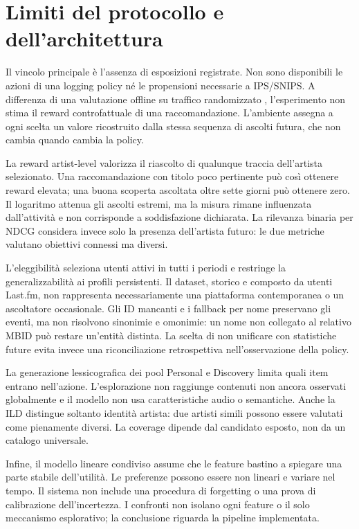 \section{Limiti del protocollo e dell'architettura}
Il vincolo principale è l'assenza di esposizioni registrate. Non sono disponibili le azioni di una logging policy né le propensioni necessarie a IPS/SNIPS. A differenza di una valutazione offline su traffico randomizzato \cite{li2010offline}, l'esperimento non stima il reward controfattuale di una raccomandazione. L'ambiente assegna a ogni scelta un valore ricostruito dalla stessa sequenza di ascolti futura, che non cambia quando cambia la policy.

La reward artist-level valorizza il riascolto di qualunque traccia dell'artista selezionato. Una raccomandazione con titolo poco pertinente può così ottenere reward elevata; una buona scoperta ascoltata oltre sette giorni può ottenere zero. Il logaritmo attenua gli ascolti estremi, ma la misura rimane influenzata dall'attività e non corrisponde a soddisfazione dichiarata. La rilevanza binaria per NDCG considera invece solo la presenza dell'artista futuro: le due metriche valutano obiettivi connessi ma diversi.

L'eleggibilità seleziona utenti attivi in tutti i periodi e restringe la generalizzabilità ai profili persistenti. Il dataset, storico e composto da utenti Last.fm, non rappresenta necessariamente una piattaforma contemporanea o un ascoltatore occasionale. Gli ID mancanti e i fallback per nome preservano gli eventi, ma non risolvono sinonimie e omonimie: un nome non collegato al relativo MBID può restare un'entità distinta. La scelta di non unificare con statistiche future evita invece una riconciliazione retrospettiva nell'osservazione della policy.

La generazione lessicografica dei pool Personal e Discovery limita quali item entrano nell'azione. L'esplorazione non raggiunge contenuti non ancora osservati globalmente e il modello non usa caratteristiche audio o semantiche. Anche la ILD distingue soltanto identità artista: due artisti simili possono essere valutati come pienamente diversi. La coverage dipende dal candidato esposto, non da un catalogo universale.

Infine, il modello lineare condiviso assume che le feature bastino a spiegare una parte stabile dell'utilità. Le preferenze possono essere non lineari e variare nel tempo. Il sistema non include una procedura di forgetting o una prova di calibrazione dell'incertezza. I confronti non isolano ogni feature o il solo meccanismo esplorativo; la conclusione riguarda la pipeline implementata.

